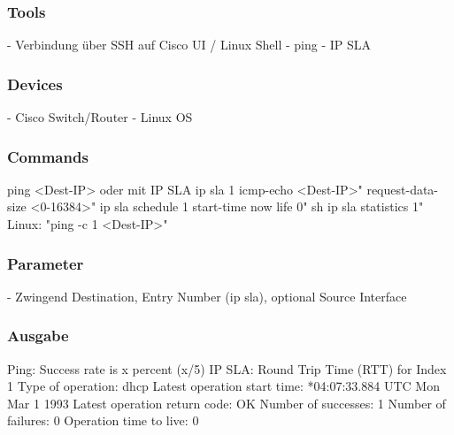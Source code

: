 \documentclass[a4,12pt]{scrartcl}
\begin{document}
\subsubsection{Tools}
- Verbindung über SSH auf Cisco UI / Linux Shell\newline
- ping\newline
- IP SLA\newline

\subsubsection{Devices}
- Cisco Switch/Router\newline
- Linux OS \newline
\subsubsection{Commands}
ping <Dest-IP>\newline\newline
oder mit IP SLA\newline
ip sla 1
icmp-echo <Dest-IP>"
request-data-size <0-16384>"\newline
ip sla schedule 1 start-time now life 0"\newline
sh ip sla statistics 1"\newline
{}
Linux: "ping -c 1 <Dest-IP>"
\subsubsection{Parameter}
- Zwingend Destination, Entry Number (ip sla), optional Source Interface
\subsubsection{Ausgabe}
Ping: \newline	 
Success rate is x percent (x/5)\newline
IP SLA:\newline
Round Trip Time (RTT) for Index 1\newline
Type of operation: dhcp\newline
Latest operation start time: *04:07:33.884 UTC Mon Mar 1 1993\newline
Latest operation return code: OK\newline
Number of successes: 1\newline
Number of failures: 0\newline
Operation time to live: 0\newline
\end{document}

